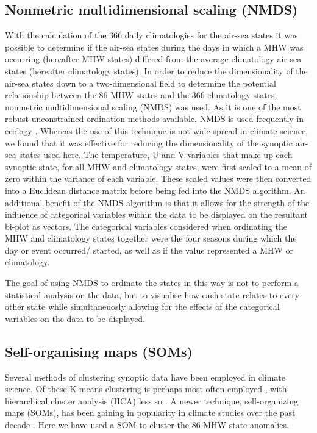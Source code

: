 \documentclass[a4paper,10pt,review]{elsarticle}
\begin{document}
\subsection{Nonmetric multidimensional scaling (NMDS)}
With the calculation of the 366 daily climatologies for the air-sea states it was possible to determine if the air-sea states during the days in which a MHW was occurring (hereafter MHW states) differed from the average climatology air-sea states (hereafter climatology states). In order to reduce the dimensionality of the air-sea states down to a two-dimensional field to determine the potential relationship between the 86 MHW states and the 366 climatology states, nonmetric multidimensional scaling (NMDS) was used. As it is one of the most robust unconstrained ordination methods available, NMDS is used frequently in ecology \citep{Minchin1987}. Whereas the use of this technique is not wide-spread in climate science, we found that it was effective for reducing the dimensionality of the synoptic air-sea states used here. The temperature, U and V variables that make up each synoptic state, for all MHW and climatology states, were first scaled to a mean of zero within the variance of each variable. These scaled values were then converted into a Euclidean distance matrix before being fed into the NMDS algorithm. An additional benefit of the NMDS algorithm is that it allows for the strength of the influence of categorical variables within the data to be displayed on the resultant bi-plot as vectors. The categorical variables considered when ordinating the MHW and climatology states together were the four seasons during which the day or event occurred/ started, as well as if the value represented a MHW or climatology.

The goal of using NMDS to ordinate the states in this way is not to perform a statistical analysis on the data, but to visualise how each state relates to every other state while simultaneuosly allowing for the effects of the categorical variables on the data to be displayed.

\subsection{Self-organising maps (SOMs)}
Several methods of clustering synoptic data have been employed in climate science. Of these K-means clustering is perhaps most often employed \citep[e.g.][]{Corte-Real1998, Burrough2001, Kumar2011}, with hierarchical cluster analysis (HCA) less so \citep[e.g.][]{Unal2003}. A newer technique, self-organizing maps (SOMs), has been gaining in popularity in climate studies over the past decade \citep[e.g.][]{Cavazos2000, Hewitson2002, Morioka2010}. Here we have used a SOM to cluster the 86 MHW state anomalies.
\end{document}
